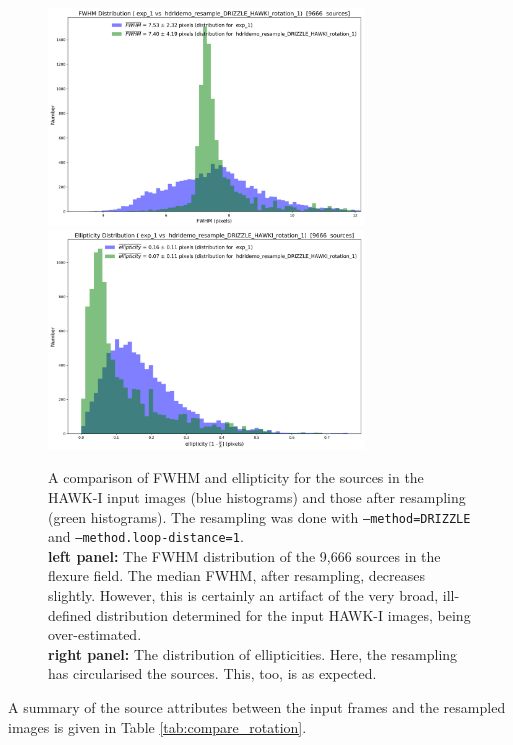 \begin{figure}[H]
\centering
\includegraphics[width=8.4cm]{figures/match_field_DRIZZLE_HAWKI_rotation_1_FWHM_histogram.png}
\includegraphics[width=8.4cm]{figures/match_field_DRIZZLE_HAWKI_rotation_1_ellipticity_histogram.png} 
\caption[]
	{\footnotesize  A comparison of FWHM and ellipticity for the sources in the HAWK-I input images (blue histograms) and those
	after resampling (green histograms).  The resampling was done with {\tt --method=DRIZZLE} and {\tt --method.loop-distance=1}.\\
	{\bf left panel:}    The FWHM distribution of the 9,666 sources in the flexure field.  The median FWHM, after resampling, decreases slightly.  
	                           However, this is certainly an artifact of the very broad, ill-defined distribution determined for the input HAWK-I images, being over-estimated.\\
	{\bf right panel:} The distribution of ellipticities.   Here, the resampling has circularised the sources.   This, too, is as expected. 
	}
	\label{fig:fwhm_ellip_flexure}
\end{figure}





A summary of the source attributes between the input frames and the resampled images is given in Table \ref{tab:compare_rotation}.



